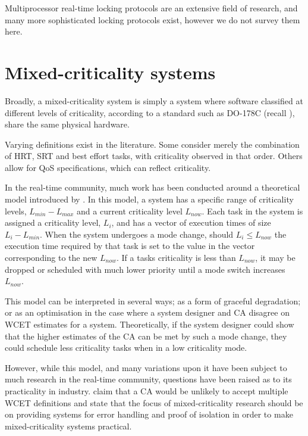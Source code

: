 Multiprocessor real-time locking protocols are an extensive field of research, and 
many more sophisticated locking protocols exist, however we do not survey them here.

\section{Mixed-criticality systems}
\label{s:mixed-criticality}

Broadly, a mixed-criticality system is simply a system where software classified at different levels
of criticality, according to a standard such as DO-178C (recall ), share
the same physical hardware. 

Varying definitions exist in the literature. Some consider merely
the combination of \gls{HRT}, \gls{SRT} and best effort tasks, with criticality observed in that order.
Others allow for \gls{QoS} specifications, which can reflect criticality. 

In the real-time community, much work has been
conducted around a theoretical model introduced by \citet{Vestal_07}. In this model, a system has
a specific range of criticality levels, $L_{min} - L_{max}$ and a current criticality level
$L_{now}$. Each task in the system is assigned a criticality level, $L_{i}$, and has a vector of
execution times of size $L_{i} - L_{min}$. When the system undergoes a mode change, should $L_{i}
\leq L_{now}$ the execution time required by that task is set to the value in the vector
corresponding to the new $L_{now}$. If a tasks criticality is less than $L_{now}$, it may be dropped
or scheduled with much lower priority until a mode switch increases $L_{now}$. 

This model can be interpreted in several ways; as a form of graceful degradation; or as an
optimisation in the case where a system designer and \gls{CA} disagree on \gls{WCET}
estimates for a system. Theoretically, if the system designer could show that the higher estimates
of the \gls{CA} can be met by such a mode change, they could schedule less criticality tasks when in
a low criticality mode. 

However, while this model, and many variations upon it have been subject to much research in the
real-time community, questions have been raised as to its practicality in industry.
\citet{Ernst_DiNatale_16} claim that a \gls{CA} would be unlikely to accept multiple \gls{WCET}
definitions and state that the focus of mixed-criticality research should be on providing systems
for error handling and proof of isolation in order to make mixed-criticality systems practical. 

